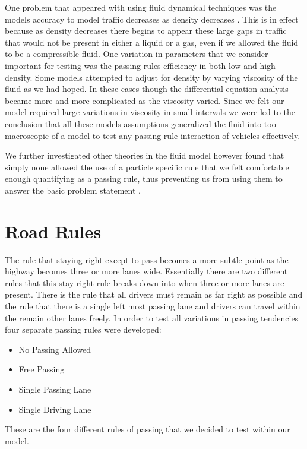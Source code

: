 \documentclass{amsart}
\begin{document}
	One problem that appeared with using fluid dynamical techniques was the models accuracy to model traffic decreases as density decreases \cite{stone2007introduction}.  This is in effect because as density decreases there begins to appear these large gaps in traffic that would not be present in either a liquid or a gas, even if we allowed the fluid to be a compressible fluid.  One variation in parameters that we consider important for testing was the passing rules efficiency in both low and high density. Some models attempted to adjust for density by varying viscosity of the fluid as we had hoped.  In these cases though the differential equation analysis became more and more complicated as the viscosity varied.  Since we felt our model required large variations in viscosity in small intervals we were led to the conclusion that all these models assumptions generalized the fluid into too macroscopic of a model to test any passing rule interaction of vehicles effectively.    

	We further investigated other theories in the fluid model however found that simply none allowed the use of a particle specific rule that we felt comfortable enough quantifying as a passing rule, thus preventing us from using them to answer the basic problem statement \cite{piccolireview}.
	

\section{\bfseries{Road Rules}}
	The rule that staying right except to pass becomes a more subtle point as the highway becomes three or more lanes wide.  Essentially there are two different rules that this stay right rule breaks down into when three or more lanes are present.  There is the rule that all drivers must remain as far right as possible and the rule that there is a single left most passing lane and drivers can travel within the remain other lanes freely.  In order to test all variations in passing tendencies four separate passing rules were developed:
		\begin{itemize}
			\item No Passing Allowed
			\item Free Passing
			\item Single Passing Lane
			\item Single Driving Lane
		\end{itemize}
	These are the four different rules of passing that we decided to test within our model.
\end{document}
